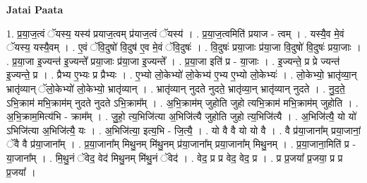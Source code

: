 \documentclass[17pt]{extarticle}
\begin{document}
\textbf{Jatai Paata} \newline

1. प्र॒या॒ज॒त्वं ॅयस्य॒ यस्य॑ प्रयाज॒त्वम् प्र॑याज॒त्वं ॅयस्य॑ । . प्र॒या॒ज॒त्वमिति॑ प्रयाज - त्वम् । . यस्यै॒व मे॒वं ॅयस्य॒ यस्यै॒वम् । . ए॒वं ॅवि॒दुषो॑ वि॒दुष॑ ए॒व मे॒वं ॅवि॒दुषः॑ । . वि॒दुषः॑ प्रया॒जाः प्र॑या॒जा वि॒दुषो॑ वि॒दुषः॑ प्रया॒जाः । . प्र॒या॒जा इ॒ज्यन्त॑ इ॒ज्यन्ते᳚ प्रया॒जाः प्र॑या॒जा इ॒ज्यन्ते᳚ । . प्र॒या॒जा इति॑ प्र - या॒जाः । . इ॒ज्यन्ते॒ प्र प्रे ज्यन्त॑ इ॒ज्यन्ते॒ प्र । . प्रैभ्य ए॒भ्यः प्र प्रैभ्यः । . ए॒भ्यो लो॒केभ्यो॑ लो॒केभ्य॑ ए॒भ्य ए॒भ्यो लो॒केभ्यः॑ । . लो॒केभ्यो॒ भ्रातृ॑व्या॒न् भ्रातृ॑व्यान् ॅलो॒केभ्यो॑ लो॒केभ्यो॒ भ्रातृ॑व्यान् । . भ्रातृ॑व्यान् नुदते नुदते॒ भ्रातृ॑व्या॒न् भ्रातृ॑व्यान् नुदते । . नु॒द॒ते॒ ऽभि॒क्राम॑ मभि॒क्राम॑म् नुदते नुदते ऽभि॒क्राम᳚म् । . अ॒भि॒क्राम॑म् जुहोति जुहो त्यभि॒क्राम॑ मभि॒क्राम॑म् जुहोति । . अ॒भि॒क्राम॒मित्य॑भि - क्राम᳚म् । . जु॒हो॒ त्य॒भिजि॑त्या अ॒भिजि॑त्यै जुहोति जुहो त्य॒भिजि॑त्यै । . अ॒भिजि॑त्यै॒ यो यो॑ ऽभिजि॑त्या अ॒भिजि॑त्यै॒ यः । . अ॒भिजि॑त्या॒ इत्य॒भि - जि॒त्यै॒ । . यो वै वै यो यो वै । . वै प्र॑या॒जाना᳚म् प्रया॒जानां॒ ॅवै वै प्र॑या॒जाना᳚म् । . प्र॒या॒जाना᳚म् मिथु॒नम् मि॑थु॒नम् प्र॑या॒जाना᳚म् प्रया॒जाना᳚म् मिथु॒नम् । . प्र॒या॒जाना॒मिति॑ प्र - या॒जाना᳚म् । . मि॒थु॒नं ॅवेद॒ वेद॑ मिथु॒नम् मि॑थु॒नं ॅवेद॑ । . वेद॒ प्र प्र वेद॒ वेद॒ प्र । . प्र प्र॒जया᳚ प्र॒जया॒ प्र प्र प्र॒जया᳚ । \newline
\end{document}
